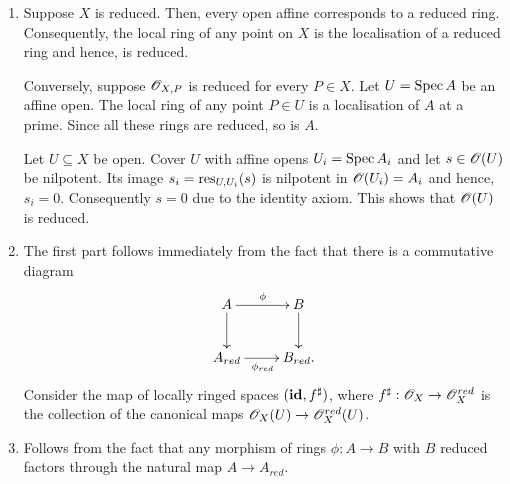 \setcounter{exercise}{2}
\begin{exercise}\hfill
\begin{enumerate}[label=(\alph*)]
    \item Suppose $X$ is reduced. Then, every open affine corresponds to a reduced ring. Consequently, the local ring of any point on $X$ is the localisation of a reduced ring and hence, is reduced.

    Conversely, suppose $\mathscr{O}_{X, P}$ is reduced for every $P\in X$. Let $U = \operatorname{Spec} A$ be an affine open. The local ring of any point $P\in U$ is a localisation of $A$ at a prime. Since all these rings are reduced, so is $A$.

    Let $U\subseteq X$ be open. Cover $U$ with affine opens $U_i = \operatorname{Spec} A_i$ and let $s\in\mathscr{O}(U)$ be nilpotent. Its image $s_i = \operatorname{res}_{U, U_i}(s)$ is nilpotent in $\mathscr{O}(U_i) = A_i$ and hence, $s_i = 0$. Consequently $s = 0$ due to the identity axiom. This shows that $\mathscr{O}(U)$ is reduced.

    \item The first part follows immediately from the fact that there is a commutative diagram 
    \begin{equation*}
        \xymatrix {
            A\ar[r]^\phi\ar[d] & B\ar[d]\\
            A_{red}\ar[r]_{\phi_{red}} & B_{red}.
        }
    \end{equation*}
    Consider the map of locally ringed spaces $(\mathbf{id}, f^\sharp)$, where $f^\sharp: \mathscr{O}_X\to\mathscr{O}_X^{red}$ is the collection of the canonical maps $\mathscr{O}_X(U)\to\mathscr{O}_X^{red}(U)$.

    \item Follows from the fact that any morphism of rings $\phi: A\to B$ with $B$ reduced factors through the natural map $A\to A_{red}$.
\end{enumerate}
\end{exercise}

